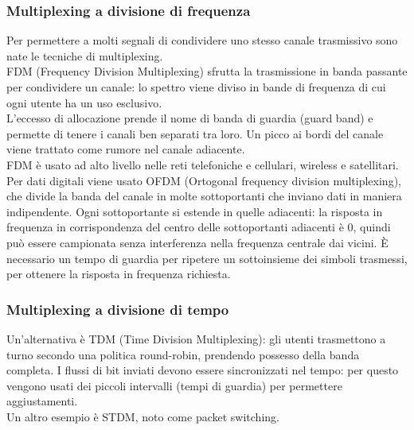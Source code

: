 \documentclass{article}
\begin{document}
		\subsubsection{Multiplexing a divisione di frequenza}
		Per permettere a molti segnali di condividere uno stesso canale trasmissivo sono nate le tecniche di multiplexing.\\
		FDM (Frequency Division Multiplexing) sfrutta la trasmissione in banda passante per condividere un canale: lo spettro viene diviso in bande di frequenza di cui ogni utente ha un uso esclusivo. \\
		L'eccesso di allocazione prende il nome di banda di guardia (guard band) e permette di tenere i canali ben separati tra loro. Un picco ai bordi del canale viene trattato come rumore nel canale adiacente.\\ FDM è usato ad alto livello nelle reti telefoniche e cellulari, wireless e satellitari. \\
		Per dati digitali viene usato OFDM (Ortogonal frequency division multiplexing), che divide la banda del canale in molte sottoportanti che inviano dati in maniera indipendente. Ogni sottoportante si estende in quelle adiacenti: la risposta in frequenza in corrispondenza del centro delle sottoportanti adiacenti è 0, quindi può essere campionata senza interferenza nella frequenza centrale dai vicini. È necessario un tempo di guardia per ripetere un sottoinsieme dei simboli trasmessi, per ottenere la risposta in frequenza richiesta.
		\subsubsection{Multiplexing a divisione di tempo}
		Un'alternativa è TDM (Time Division Multiplexing): gli utenti trasmettono a turno secondo una politica round-robin, prendendo possesso della banda completa. I flussi di bit inviati devono essere sincronizzati nel tempo: per questo vengono usati dei piccoli intervalli (tempi di guardia) per permettere aggiustamenti. \\
		Un altro esempio è STDM, noto come packet switching.
\end{document}
